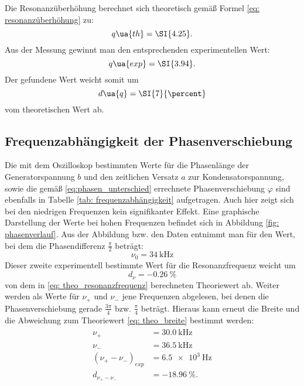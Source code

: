 Die Resonanzüberhöhung berechnet sich theoretisch gemäß Formel \eqref{eq: resonanzüberhöhung} zu:
\begin{equation}
  q\ua{th} = \SI{4.25}.
\end{equation}
Aus der Messung gewinnt man den entsprechenden experimentellen Wert:
\begin{equation}
    q\ua{exp} = \SI{3.94}.
\end{equation}
Der gefundene Wert weicht somit um
\begin{equation}
  d\ua{q} = \SI{7}{\percent}
\end{equation}
vom theoretischen Wert ab.

\subsection{Frequenzabhängigkeit der Phasenverschiebung}
Die mit dem Oszilloskop bestimmten Werte für die Phasenlänge der Generatorspannung $b$ und den zeitlichen Versatz $a$ zur Kondensatorspannung, sowie die gemäß \eqref{eq:phasen_unterschied}
errechnete Phasenverschiebung $\varphi$ sind ebenfalls in Tabelle \ref{tab: frequenzabhängigkeit} aufgetragen. Auch hier zeigt sich bei den niedrigen
Frequenzen kein signifikanter Effekt. Eine graphische Darstellung der Werte bei hohen Frequenzen befindet sich in
Abbildung \ref{fig: phasenverlauf}. Aus der Abbildung bzw. den Daten entnimmt man für den Wert, bei dem die Phasendifferenz $\frac{\pi}{2}$ beträgt:
\begin{equation}
  \nu_0 = \SI{34}{\kilo\hertz}
\end{equation}
Dieser zweite experimentell bestimmte Wert für die Resonanzfrequenz weicht um
\begin{equation}
  d_{\nu} = \SI{-0.26}{\percent}
\end{equation}
von dem in \eqref{eq: theo_resonanzfrequenz} berechneten Theoriewert ab.
Weiter werden als Werte für $\nu_+$ und $\nu_-$ jene Frequenzen abgelesen, bei denen die Phasenverschiebung
gerade $\frac{3\pi}{4}$ bzw. $\frac{\pi}{4}$ beträgt. Hieraus kann erneut die Breite und die Abweichung
zum Theoriewert \eqref{eq: theo_breite} bestimmt werden:
\begin{align}
  \begin{aligned}
  \nu_{+} &= \SI{30.0}{\kilo\hertz} \\
  \nu_{-} &= \SI{36.5}{\kilo\hertz} \\
  (\nu_{+}-\nu_{-})_{exp} &= \SI{6.5e3}{\hertz} \\
  d_{\nu_{+}-\nu_{-}} &= \SI{-18.96}{\percent}.
\end{aligned}
\end{align}



